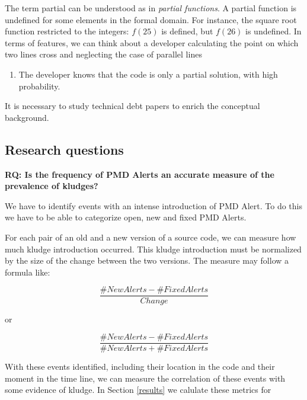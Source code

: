 \documentclass[
]{article}
\providecommand{\tightlist}{%
  \setlength{\itemsep}{0pt}\setlength{\parskip}{0pt}}
\begin{document}
The term partial can be understood as in \textit{partial functions}. A partial
function is undefined for some elements in the formal domain. For instance, the
square root function restricted to the integers: $f(25)$ is defined, but $f(26)$
is undefined. In terms of features, we can think about a developer calculating 
the point on which two lines cross and neglecting the case of parallel lines

\begin{enumerate}
\def\labelenumi{\arabic{enumi}.}
\setcounter{enumi}{1}
\tightlist
\item
  The developer knows that the code is only a partial solution, with high
  probability.
\end{enumerate}

It is necessary to study technical debt papers to enrich the conceptual
background.

\subsection{Research questions}

\noindent
\textbf{RQ: Is the frequency of PMD Alerts an accurate measure of the prevalence of kludges?} %

We have to identify events with an intense introduction of PMD Alert. To do this we have to be able to categorize open, new and fixed PMD Alerts.

For each pair of an old and a new version of a source code, we can measure how much
kludge introduction occurred. This kludge introduction must be normalized by the size 
of the change between the two versions. The measure may follow a formula like:

%
%

\[ \frac{\#NewAlerts - \#FixedAlerts}{Change}    \]

or

\[ \frac{\#NewAlerts - \#FixedAlerts}{\#NewAlerts + \#FixedAlerts}    \]

With these events identified, including their location in the code and
their moment in the time line, we can measure the correlation of these
events with some evidence of kludge. In Section \ref{results} we
calulate these metrics for

%
%
\end{document}
